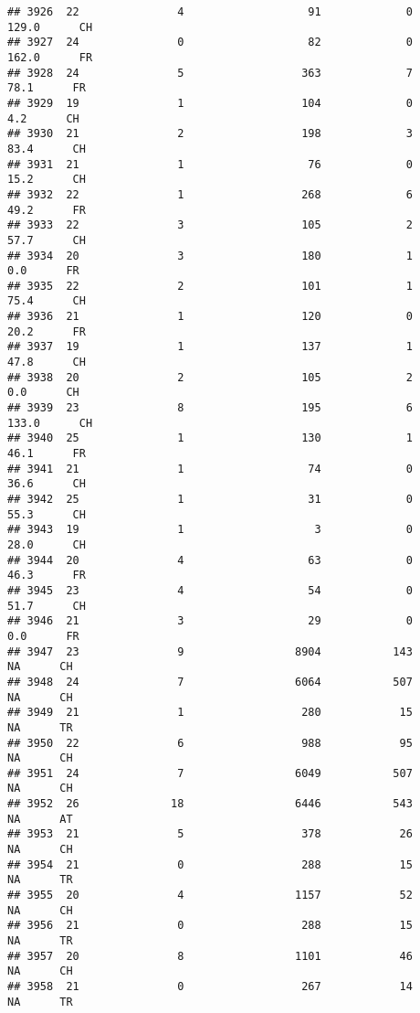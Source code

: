 \documentclass[
]{article}
\begin{document}
\begin{verbatim}
## 3926  22               4                   91             0    129.0      CH
## 3927  24               0                   82             0    162.0      FR
## 3928  24               5                  363             7     78.1      FR
## 3929  19               1                  104             0      4.2      CH
## 3930  21               2                  198             3     83.4      CH
## 3931  21               1                   76             0     15.2      CH
## 3932  22               1                  268             6     49.2      FR
## 3933  22               3                  105             2     57.7      CH
## 3934  20               3                  180             1      0.0      FR
## 3935  22               2                  101             1     75.4      CH
## 3936  21               1                  120             0     20.2      FR
## 3937  19               1                  137             1     47.8      CH
## 3938  20               2                  105             2      0.0      CH
## 3939  23               8                  195             6    133.0      CH
## 3940  25               1                  130             1     46.1      FR
## 3941  21               1                   74             0     36.6      CH
## 3942  25               1                   31             0     55.3      CH
## 3943  19               1                    3             0     28.0      CH
## 3944  20               4                   63             0     46.3      FR
## 3945  23               4                   54             0     51.7      CH
## 3946  21               3                   29             0      0.0      FR
## 3947  23               9                 8904           143       NA      CH
## 3948  24               7                 6064           507       NA      CH
## 3949  21               1                  280            15       NA      TR
## 3950  22               6                  988            95       NA      CH
## 3951  24               7                 6049           507       NA      CH
## 3952  26              18                 6446           543       NA      AT
## 3953  21               5                  378            26       NA      CH
## 3954  21               0                  288            15       NA      TR
## 3955  20               4                 1157            52       NA      CH
## 3956  21               0                  288            15       NA      TR
## 3957  20               8                 1101            46       NA      CH
## 3958  21               0                  267            14       NA      TR

\end{verbatim}
\end{document}

